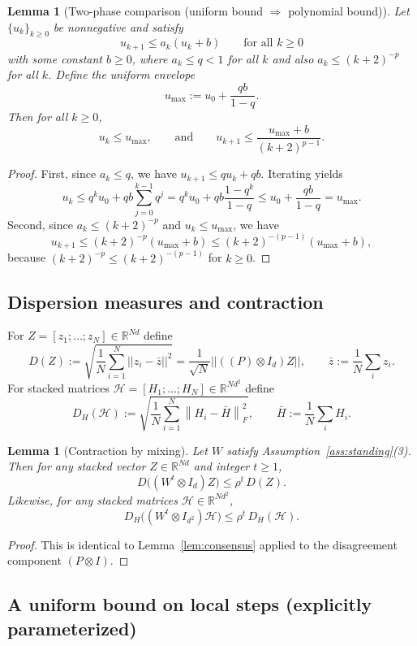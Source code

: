 \documentclass[11pt,a4paper]{article}
\def\one{1}%
\def\J{J}%
\def\Pmat{P}%
\def\norm#1{||#1||}%
\newtheorem{lemma}[theorem]{Lemma}
\newcommand{\R}{\mathbb{R}}
\newcommand{\one}{\mathbf{1}}
\newcommand{\norm}[1]{\left\|#1\right\|}
\newcommand{\normF}[1]{\left\|#1\right\|_F}
\newcommand{\J}{\left(\frac{1}{N}\one\one^\top\right)}
\newcommand{\Pmat}{I-\J}
\begin{document}
\begin{lemma}[Two-phase comparison (uniform bound $\Rightarrow$ polynomial bound)]\label{lem:two_phase}
	Let $\{u_k\}_{k\ge 0}$ be nonnegative and satisfy
	\[
	u_{k+1}\le a_k(u_k+b)\qquad\text{for all }k\ge 0
	\]
	with some constant $b\ge 0$, where $a_k\le q<1$ for all $k$ and also $a_k\le (k+2)^{-p}$ for all $k$.
	Define the uniform envelope
	\[
	u_{\max}:=u_0+\frac{qb}{1-q}.
	\]
	Then for all $k\ge 0$,
	\[
	u_k\le u_{\max},
	\qquad\text{and}\qquad
	u_{k+1}\le \frac{u_{\max}+b}{(k+2)^{p-1}}.
	\]
\end{lemma}
\begin{proof}
	First, since $a_k\le q$, we have $u_{k+1}\le q u_k+qb$.
	Iterating yields
	\[
	u_k\le q^k u_0 + qb\sum_{j=0}^{k-1}q^j
	= q^k u_0 + qb\frac{1-q^k}{1-q}\le u_0+\frac{qb}{1-q}=u_{\max}.
	\]
	Second, since $a_k\le (k+2)^{-p}$ and $u_k\le u_{\max}$, we have
	\[
	u_{k+1}\le (k+2)^{-p}(u_{\max}+b)\le (k+2)^{-(p-1)}(u_{\max}+b),
	\]
	because $(k+2)^{-p}\le (k+2)^{-(p-1)}$ for $k\ge 0$.
\end{proof}

\subsection{Dispersion measures and contraction}

For $Z=[z_1;\dots;z_N]\in\R^{Nd}$ define
\[
D(Z):=\sqrt{\frac1N\sum_{i=1}^N\norm{z_i-\bar z}^2}
=\frac{1}{\sqrt N}\norm{((\Pmat)\otimes I_d)Z},
\qquad \bar z:=\frac1N\sum_i z_i.
\]
For stacked matrices $\mathcal H=[H_1;\dots;H_N]\in\R^{Nd^2}$ define
\[
D_H(\mathcal H):=\sqrt{\frac1N\sum_{i=1}^N\normF{H_i-\bar H}^2},
\qquad \bar H:=\frac1N\sum_i H_i.
\]

\begin{lemma}[Contraction by mixing]\label{lem:mix_contract_app}
	Let $W$ satisfy Assumption~\ref{ass:standing}(3). Then for any stacked vector $Z\in\R^{Nd}$ and integer $t\ge 1$,
	\[
	D\big((W^t\otimes I_d)Z\big)\le \rho^t\,D(Z).
	\]
	Likewise, for any stacked matrices $\mathcal H\in\R^{Nd^2}$,
	\[
	D_H\big((W^t\otimes I_{d^2})\mathcal H\big)\le \rho^t\,D_H(\mathcal H).
	\]
\end{lemma}
\begin{proof}
	This is identical to Lemma~\ref{lem:consensus} applied to the disagreement component $(\Pmat\otimes I)$.
\end{proof}

\subsection{A uniform bound on local steps (explicitly parameterized)}
\end{document}

